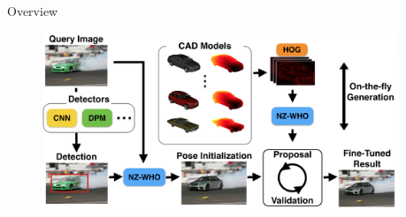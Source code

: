 \documentclass[serif,mathserif,final]{beamer}
\newcommand{\1}{\mathbb{I}} %
\begin{document}
\begin{frame}{}
  \vspace{0.1em}
  \begin{columns}[t]
    \begin{column}{0.3\linewidth}
      \begin{block}{Overview}
        \begin{figure}[t]
          \centering
          \includegraphics[width=0.95\linewidth]{front} %
        \end{figure}

      \end{block}
    \end{column}

    \begin{column}{0.3\linewidth}


\end{column}
\end{columns}
\end{frame}
\end{document}
